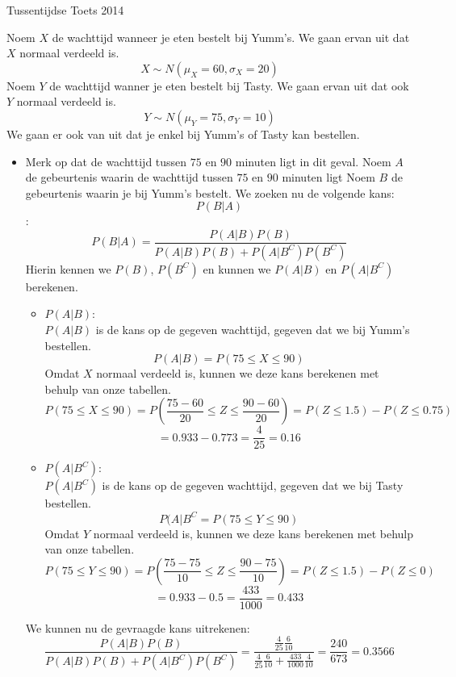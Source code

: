 \documentclass[main.tex]{subfiles}
\begin{document}
\begin{examenvraag}{Tussentijdse Toets 2014}
  \begin{ex-antwoord}
    Noem $X$ de wachttijd wanneer je eten bestelt bij Yumm's.
    We gaan ervan uit dat $X$ normaal verdeeld is.
    \[ X \sim N(\mu_{X}=60,\sigma_{X}=20) \]
    Noem $Y$ de wachttijd wanner je eten bestelt bij Tasty.
    We gaan ervan uit dat ook $Y$ normaal verdeeld is.
    \[ Y \sim N(\mu_{Y}=75,\sigma_{Y}=10) \]
    We gaan er ook van uit dat je enkel bij Yumm's of Tasty kan bestellen.
    \begin{itemize}
    \item 
      Merk op dat de wachttijd tussen $75$ en $90$ minuten ligt in dit geval.
      Noem $A$ de gebeurtenis waarin de wachttijd tussen $75$ en $90$ minuten ligt
      Noem $B$ de gebeurtenis waarin je bij Yumm's bestelt.
      We zoeken nu de volgende kans:
      \[ P(B|A) \]
      :
      \[ 
      P(B|A) = \frac{P(A|B)P(B)}{P(A|B)P(B) + P(A|B^{C})P(B^{C})}
      \]
      Hierin kennen we $P(B)$, $P(B^{C})$ en kunnen we $P(A|B)$ en $P(A|B^{C})$ berekenen.
      \begin{itemize}
      \item $P(A|B)$:\\
        $P(A|B)$ is de kans op de gegeven wachttijd, gegeven dat we bij Yumm's bestellen.
        \[ P(A|B) = P(75 \le X \le 90) \]
        Omdat $X$ normaal verdeeld is, kunnen we deze kans berekenen met behulp van onze tabellen.
        \[ P(75 \le X \le 90) = P(\frac{75-60}{20} \le Z \le \frac{90-60}{20}) = P(Z \le 1.5) - P(Z \le 0.75)\]
        \[ = 0.933 - 0.773 = \frac{4}{25} = 0.16 \]
      \item $P(A|B^{C})$:\\
        $P(A|B^{C})$ is de kans op de gegeven wachttijd, gegeven dat we bij Tasty bestellen.
        \[ P(A|B^{C} = P(75 \le Y \le 90) \]
        Omdat $Y$ normaal verdeeld is, kunnen we deze kans berekenen met behulp van onze tabellen.
        \[ P(75 \le Y \le 90) = P(\frac{75-75}{10} \le Z \le \frac{90-75}{10}) = P(Z \le 1.5) - P(Z \le 0) \]
        \[ = 0.933 - 0.5 = \frac{433}{1000} = 0.433 \]
      \end{itemize}
      We kunnen nu de gevraagde kans uitrekenen:
      \[ \frac{P(A|B)P(B)}{P(A|B)P(B) + P(A|B^{C})P(B^{C})} = \frac{\frac{4}{25}\frac{6}{10}}{\frac{4}{25}\frac{6}{10} + \frac{433}{1000}\frac{4}{10}} = \frac{240}{673} = 0.3566 \]


\end{itemize}
\end{ex-antwoord}
\end{examenvraag}
\end{document}
